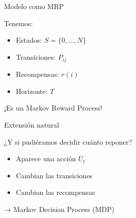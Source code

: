 \documentclass{beamer}
\begin{document}
\begin{frame}{Modelo como MRP}

Tenemos:

\begin{itemize}
\item Estados: \(S = \{0,\dots,N\}\)
\item Transiciones: \(P_{ij}\)
\item Recompensas: \(r(i)\)
\item Horizonte: \(T\)
\end{itemize}

\pause

\begin{center}
\Large
¡Es un Markov Reward Process!
\end{center}

\end{frame}

\begin{frame}{Extensión natural}

\begin{center}
\Large
¿Y si pudiéramos decidir cuánto reponer?
\end{center}

\pause

\begin{itemize}
\item Aparece una acción \(U_t\)
\item Cambian las transiciones
\item Cambian las recompensas
\end{itemize}

\pause

\begin{center}
\Large
→ Markov Decision Process (MDP)
\end{center}

\end{frame}
\end{document}
